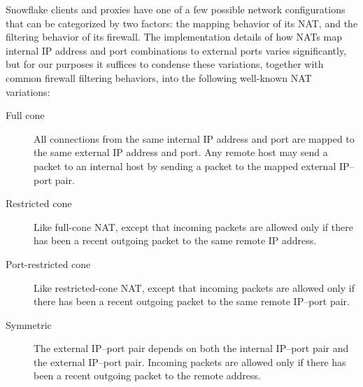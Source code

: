 \documentclass[letterpaper,twocolumn]{article}
\begin{document}

Snowflake clients and proxies have one of a few possible
network configurations that can be categorized by two factors:
the mapping behavior of its NAT,
and the filtering behavior of its firewall.
The implementation details of how NATs map internal IP address and port combinations
to external ports varies significantly, but for our purposes it suffices
to condense these variations, together with common firewall filtering behaviors,
into the following well-known NAT variations:

\begin{description}
\item[Full cone]
All connections from the same internal IP address
and port are mapped to the same external IP address and port. Any remote
host may send a packet to an internal host by sending a packet to the
mapped external IP--port pair.
\item[Restricted cone]
Like full-cone NAT,
except that incoming packets
are allowed only if
there has been a recent outgoing packet
to the same remote IP address.
\item[Port-restricted cone]
Like restricted-cone NAT,
except that incoming packets are allowed only if
there has been a recent outgoing packet
to the same remote IP--port pair.
\item[Symmetric]
The external IP--port pair depends on both
the internal IP--port pair and the external IP--port pair.
Incoming packets are allowed only if
there has been a recent outgoing
packet to the remote address.
\end{description}
\end{document}

